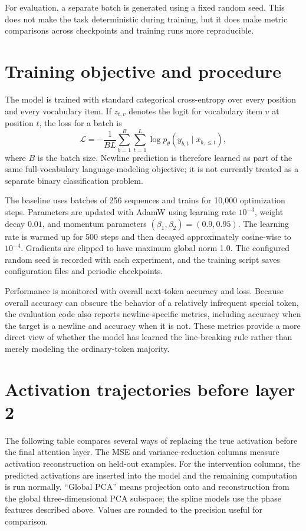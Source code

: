 \documentclass[11pt]{article}
\begin{document}
For evaluation, a separate batch is generated using a fixed random seed.  This
does not make the task deterministic during training, but it does make metric
comparisons across checkpoints and training runs more reproducible.

\section{Training objective and procedure}

The model is trained with standard categorical cross-entropy over every
position and every vocabulary item.  If $z_{t,v}$ denotes the logit for
vocabulary item $v$ at position $t$, the loss for a batch is
\[
    \mathcal{L}
    = -\frac{1}{BL}\sum_{b=1}^{B}\sum_{t=1}^{L}
      \log p_\theta\!\left(y_{b,t}\mid x_{b,\leq t}\right),
\]
where $B$ is the batch size.  Newline prediction is therefore learned as part
of the same full-vocabulary language-modeling objective; it is not currently
treated as a separate binary classification problem.

The baseline uses batches of 256 sequences and trains for 10,000 optimization
steps.  Parameters are updated with AdamW using learning rate $10^{-3}$,
weight decay $0.01$, and momentum parameters $(\beta_1,\beta_2)=(0.9,0.95)$.
The learning rate is warmed up for 500 steps and then decayed approximately
cosine-wise to $10^{-4}$.  Gradients are clipped to have maximum global norm
1.0.  The configured random seed is recorded with each experiment, and the
training script saves configuration files and periodic checkpoints.

Performance is monitored with overall next-token accuracy and loss.  Because
overall accuracy can obscure the behavior of a relatively infrequent special
token, the evaluation code also reports newline-specific metrics, including
accuracy when the target is a newline and accuracy when it is not.  These
metrics provide a more direct view of whether the model has learned the
line-breaking rule rather than merely modeling the ordinary-token majority.

\section{Activation trajectories before layer 2}

The following table compares several ways of replacing the true activation
before the final attention layer. The MSE and variance-reduction columns
measure activation reconstruction on held-out examples. For the intervention
columns, the predicted activations are inserted into the model and the
remaining computation is run normally. ``Global PCA'' means projection onto
and reconstruction from the global three-dimensional PCA subspace; the spline
models use the phase features described above. Values are rounded to the
precision useful for comparison.
\end{document}
